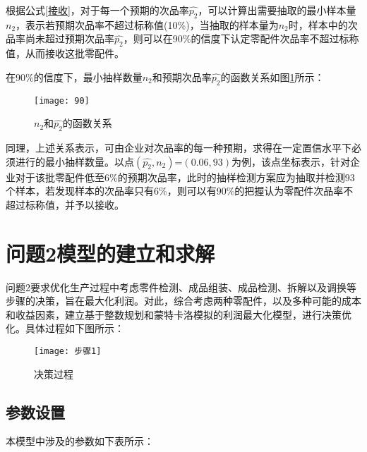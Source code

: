 \documentclass[withoutpreface,bwprint]{cumcmthesis} %
\begin{document}
根据公式\ref{接收}，对于每一个预期的次品率$\hat{p_2}$，可以计算出需要抽取的最小样本量$n_2$，表示若预期次品率不超过标称值(10\%)，当抽取的样本量为$n_2$时，样本中的次品率尚未超过预期次品率$\hat{p_2}$，则可以在90\%的信度下认定零配件次品率不超过标称值，从而接收这批零配件。

在90\%的信度下，最小抽样数量$n_2$和预期次品率$\hat{p_2}$的函数关系如图\ref{pic.2}所示：

\begin{figure}[htbp]  %
	\centering  %
	\texttt{[image: 90]} %
	\caption{$n_2$和$\hat{p_2}$的函数关系}  
	\label{pic.2}
\end{figure}

同理，上述关系表示，可由企业对次品率的每一种预期，求得在一定置信水平下必须进行的最小抽样数量。以点$(\hat{p_2},n_2)$=$(0.06,93)$为例，该点坐标表示，针对企业对于该批零配件低至6\%的预期次品率，此时的抽样检测方案应为抽取并检测93个样本，若发现样本的次品率只有6\%，则可以有90\%的把握认为零配件次品率不超过标称值，并予以接收。




\section{问题2模型的建立和求解}

问题2要求优化生产过程中考虑零件检测、成品组装、成品检测、拆解以及调换等步骤的决策，旨在最大化利润。对此，综合考虑两种零配件，以及多种可能的成本和收益因素，建立基于整数规划和蒙特卡洛模拟的利润最大化模型，进行决策优化。具体过程如下图所示：

\begin{figure}[htbp]  %
	\centering  %
	\texttt{[image: 步骤1]} %
	\caption{决策过程}  
	\label{pic1}
\end{figure}


\subsection{参数设置}
本模型中涉及的参数如下表所示：
\end{document}
